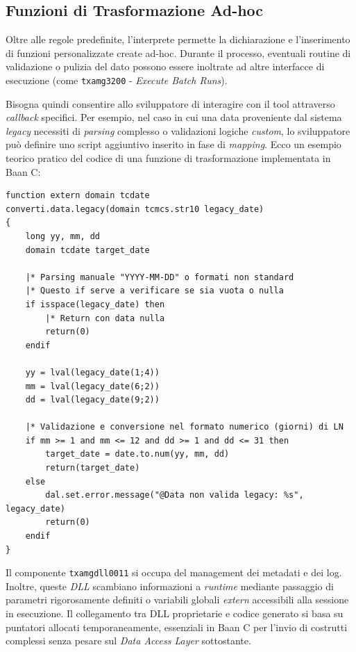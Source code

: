 \subsection{Funzioni di Trasformazione Ad-hoc}\label{subsec:funzioni-di-trasformazione-ad-hoc}
Oltre alle regole predefinite, l'interprete permette la dichiarazione e l'inserimento di funzioni personalizzate create ad-hoc.
Durante il processo, eventuali routine di validazione o pulizia del dato possono essere inoltrate ad altre
interfacce di esecuzione (come \texttt{txamg3200} - \textit{Execute Batch Runs}).

Bisogna quindi consentire allo sviluppatore di interagire con il tool attraverso \textit{callback} specifici.
Per esempio, nel caso in cui una data proveniente dal sistema \textit{legacy} necessiti di \textit{parsing} complesso
o validazioni logiche \textit{custom}, lo sviluppatore può definire uno script aggiuntivo inserito in fase di \textit{mapping}.
Ecco un esempio teorico pratico del codice di una funzione di trasformazione implementata in Baan C:

\begin{listing}[H]
\begin{verbatim}
function extern domain tcdate
converti.data.legacy(domain tcmcs.str10 legacy_date)
{
    long yy, mm, dd
    domain tcdate target_date

    |* Parsing manuale "YYYY-MM-DD" o formati non standard
    |* Questo if serve a verificare se sia vuota o nulla
    if isspace(legacy_date) then
        |* Return con data nulla
        return(0)
    endif

    yy = lval(legacy_date(1;4))
    mm = lval(legacy_date(6;2))
    dd = lval(legacy_date(9;2))

    |* Validazione e conversione nel formato numerico (giorni) di LN
    if mm >= 1 and mm <= 12 and dd >= 1 and dd <= 31 then
        target_date = date.to.num(yy, mm, dd)
        return(target_date)
    else
        dal.set.error.message("@Data non valida legacy: %s", legacy_date)
        return(0)
    endif
}
\end{verbatim}
\caption{Esempio di funzione di trasformazione \textit{ad-hoc} sviluppata per manipolare date non standard.}
\label{lst:callback_ad_hoc}
\end{listing}

Il componente \texttt{txamgdll0011} si occupa del management dei metadati e dei log. 
Inoltre, queste \textit{DLL} scambiano informazioni a \textit{runtime} mediante passaggio di parametri rigorosamente definiti o variabili globali \textit{extern} accessibili alla sessione in esecuzione. 
Il collegamento tra DLL proprietarie e codice generato si basa su puntatori allocati temporaneamente, essenziali in Baan C per l'invio di costrutti complessi senza pesare sul \textit{Data Access Layer} sottostante.

